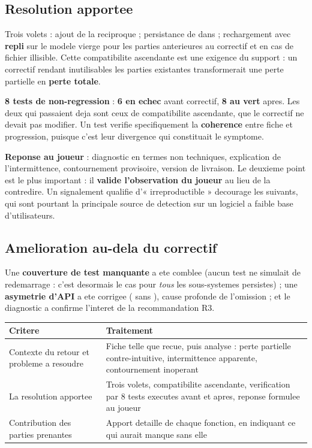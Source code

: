 \subsection{Resolution apportee}

Trois volets : ajout de la reciproque  ; persistance de
 dans  ; rechargement avec \textbf{repli} sur le modele
vierge pour les parties anterieures au correctif et en cas de fichier illisible. Cette
compatibilite ascendante est une exigence du support : un correctif rendant inutilisables les
parties existantes transformerait une perte partielle en \textbf{perte totale}.

\textbf{8 tests de non-regression} : \textcolor{RougeKo}{\textbf{6 en echec}} avant correctif,
\textcolor{VertOk}{\textbf{8 au vert}} apres. Les deux qui passaient deja sont ceux de
compatibilite ascendante, que le correctif ne devait pas modifier. Un test verifie specifiquement
la \textbf{coherence} entre fiche et progression, puisque c'est leur divergence qui constituait le
symptome.

\textbf{Reponse au joueur} : diagnostic en termes non techniques, explication de l'intermittence,
contournement provisoire, version de livraison. Le deuxieme point est le plus important : il
\textbf{valide l'observation du joueur} au lieu de la contredire. Un signalement qualifie
d'« irreproductible » decourage les suivants, qui sont pourtant la principale source de detection
sur un logiciel a faible base d'utilisateurs.

\subsection{Amelioration au-dela du correctif}

Une \textbf{couverture de test manquante} a ete comblee (aucun test ne simulait de redemarrage :
c'est desormais le cas pour \emph{tous} les sous-systemes persistes) ; une \textbf{asymetrie d'API}
a ete corrigee ( sans ), cause profonde de l'omission ; et le
diagnostic a confirme l'interet de la recommandation R3.

\couverture
\footnotesize
\begin{tabularx}{\linewidth}{@{}L{4.4cm} X@{}}
\toprule
\textbf{Critere} & \textbf{Traitement} \\
\midrule
Contexte du retour et probleme a resoudre & Fiche telle que recue, puis analyse : perte partielle contre-intuitive, intermittence apparente, contournement inoperant \\
La resolution apportee & Trois volets, compatibilite ascendante, verification par 8 tests executes avant et apres, reponse formulee au joueur \\
Contribution des parties prenantes & Apport detaille de chaque fonction, en indiquant ce qui aurait manque sans elle \\
\bottomrule
\end{tabularx}
\normalsize

